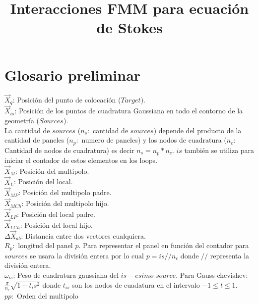 \documentclass[letter,10pt]{article}
\title{\textbf{Interacciones FMM para ecuación de Stokes}}
\date{}
\begin{document}
\maketitle

\section*{Glosario preliminar}

$\vec{X}_q$: Posición del punto de colocación ($Target$).\\

$\vec{X}_{is}$: Posición de los puntos de cuadratura Gaussiana en todo el contorno de la geometría ($Sources$).\\
La cantidad de $sources$ ($n_s:$ cantidad de $sources$) depende del producto de la cantidad de paneles ($n_p:$ numero de paneles) y los nodos de cuadratura ($n_c:$ Cantidad de nodos de cuadratura) es decir $n_s = n_p*n_c$. $is$ también se utiliza para iniciar el contador de estos elementos en los loops.\\

$\vec{X}_M$: Posición del multipolo.\\

$\vec{X}_L$: Posición del local.\\

$\vec{X}_{MP}$: Posición del multipolo padre.\\

$\vec{X}_{MCh}$: Posición del multipolo hijo.\\

$\vec{X}_{LP}$: Posición del local padre.\\

$\vec{X}_{LCh}$: Posición del local hijo.\\

$\Delta \vec{X}_{ab}$: Distancia entre dos vectores cualquiera.\\

$R_p:$ longitud del panel $p$. Para representar el panel en función del contador para $sources$ se usara la división entera por lo cual $p = is//n_c$ donde $//$ representa la división entera.\\

$\omega_{is}$: Peso de cuadratura gaussiana del $is-esimo$ $source$. Para Gauss-chevishev: $\frac{\pi}{n_c}\sqrt{1-t_is^2}$ donde $t_{is}$ son los nodos de cuadatura en el intervalo $-1 \leq t\leq 1$.\\

$pp:$ Orden del multipolo 
\end{document}
